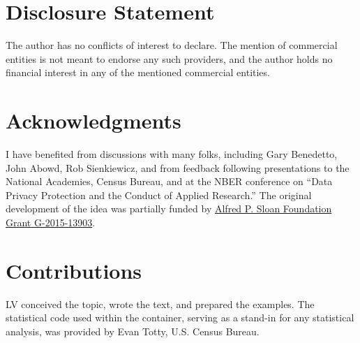 \documentclass[inline]{hdsr}
\begin{document}
\section*{Disclosure Statement}
The author has no conflicts of interest to declare. The mention of commercial entities is not meant to endorse any such providers, and the author holds no financial interest in any of the mentioned commercial entities.

\section*{Acknowledgments}

I have benefited from discussions with many folks, including Gary Benedetto, John Abowd, Rob Sienkiewicz, and from feedback following presentations to the National Academies, Census Bureau, and at the NBER conference on ``Data Privacy Protection and the Conduct of Applied Research.'' The original development of the idea was partially funded by \href{https://sloan.org/grant-detail/6845}{Alfred P. Sloan Foundation Grant G-2015-13903}.

\section*{Contributions}

LV conceived the topic, wrote the text, and prepared the examples. The statistical code used within the container, serving as a stand-in for any statistical analysis, was provided by Evan Totty, U.S. Census Bureau.  


\appendix




\printbibliography

%
\end{document}

